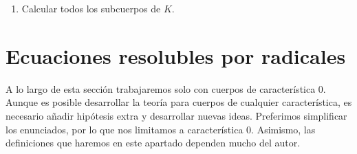 \begin{ejercicio}
\begin{enumerate}
\begin{itemize}
            Por el Lema de la Torre, deducimos que $\bb{Q}(\sqrt{5},i) = K^{\langle \tau_{2,1} \rangle}$.

            \item Ahora ya tenemos que buscar que transpongan. Vemos que:
            \begin{equation*}
                \tau_{1,3}(\sqrt[4]{5}(1+i)) = \sqrt[4]{5}(1+i)
            \end{equation*}
            Por tanto:
            \begin{equation*}
               \bb{Q} \leq \bb{Q}(\sqrt[4]{5}(1+i)) \leq K^{\langle \tau_{1,3} \rangle}
            \end{equation*}

            Como $\Irr(\sqrt[4]{5}(1+i),\bb{Q}) = x^4+20$ por Eisenstein, tenemos que $[\bb{Q}(\sqrt[4]{5}(1+i)):\bb{Q}] = 4$, y por el Lema de la Torre, deducimos que $\bb{Q}(\sqrt[4]{5}(1+i)) = K^{\langle \tau_{1,3} \rangle}$.

            \item Finalmente, vemos que:
            \begin{equation*}
                \tau_{3,3}(\sqrt[4]{5}(1-i)) = \sqrt[4]{5}(1-i)
            \end{equation*}
            Por tanto:
            \begin{equation*}
               \bb{Q} \leq \bb{Q}(\sqrt[4]{5}(1-i)) \leq K^{\langle \tau_{3,3} \rangle}
            \end{equation*}

            Como $\Irr(\sqrt[4]{5}(1-i),\bb{Q}) = x^4-20$ por Eisenstein, tenemos que $[\bb{Q}(\sqrt[4]{5}(1-i)):\bb{Q}] = 4$, y por el Lema de la Torre, deducimos que $\bb{Q}(\sqrt[4]{5}(1-i)) = K^{\langle \tau_{3,3} \rangle}$.

        \end{itemize}
        \item Calcular todos los subcuerpos de $K$.
    \end{enumerate}
\end{ejercicio}

\section{Ecuaciones resolubles por radicales}

A lo largo de esta sección trabajaremos solo con cuerpos de característica $0$. Aunque es posible desarrollar la teoría para cuerpos de cualquier característica, es necesario añadir hipótesis extra y desarrollar nuevas ideas. Preferimos simplificar los enunciados, por lo que nos limitamos a característica $0$. Asimismo, las definiciones que haremos en este apartado dependen mucho del autor.\\


